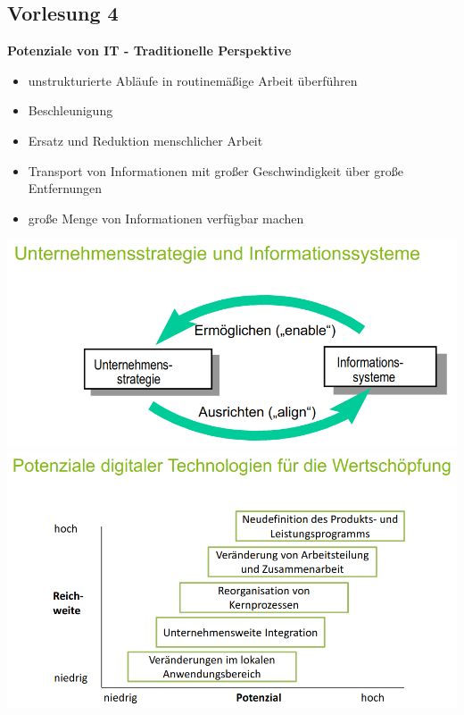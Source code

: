 \documentclass[a4]{scrartcl}
\begin{document}
\subsection*{Vorlesung 4}

\textbf{Potenziale von IT - Traditionelle Perspektive}

\begin{itemize}
\item unstrukturierte Abläufe in routinemäßige Arbeit überführen
\item Beschleunigung
\item Ersatz und Reduktion menschlicher Arbeit
\item Transport von Informationen mit großer Geschwindigkeit über große Entfernungen
\item große Menge von Informationen verfügbar machen
\end{itemize}

\includegraphics[scale=0.3]{UIS.png}
\\
\includegraphics[scale=0.3]{Potenziale.png}
\end{document}

